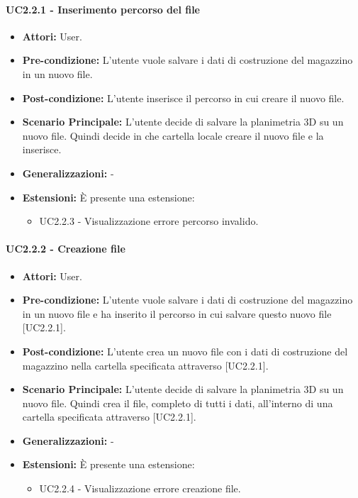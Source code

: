 \paragraph{UC2.2.1 - Inserimento percorso del file}
\begin{itemize}
    \item \textbf{Attori:} User.
    \item \textbf{Pre-condizione:} L'utente vuole salvare i dati di costruzione del magazzino in un nuovo file.
    \item \textbf{Post-condizione:} L'utente inserisce il percorso in cui creare il nuovo file.
    \item \textbf{Scenario Principale:} L'utente decide di salvare la planimetria 3D su un nuovo file. Quindi decide in che cartella locale creare il nuovo file e la inserisce.
    \item \textbf{Generalizzazioni:} -
    \item \textbf{Estensioni:} È presente una estensione:
    \begin{itemize}
        \item UC2.2.3 - Visualizzazione errore percorso invalido.
    \end{itemize}
\end{itemize}


\paragraph{UC2.2.2 - Creazione file}
\begin{itemize}
    \item \textbf{Attori:} User.
    \item \textbf{Pre-condizione:}  L'utente vuole salvare i dati di costruzione del magazzino in un nuovo file e ha inserito il percorso in cui salvare questo nuovo file [UC2.2.1].
    \item \textbf{Post-condizione:} L'utente crea un nuovo file con i dati di costruzione del magazzino nella cartella specificata attraverso [UC2.2.1].
    \item \textbf{Scenario Principale:} L'utente decide di salvare la planimetria 3D su un nuovo file. Quindi crea il file, completo di tutti i dati, all'interno di una cartella specificata attraverso [UC2.2.1].
    \item \textbf{Generalizzazioni:} -
    \item \textbf{Estensioni:} È presente una estensione:
    \begin{itemize}
        \item UC2.2.4 - Visualizzazione errore creazione file.
    \end{itemize}    
\end{itemize}


